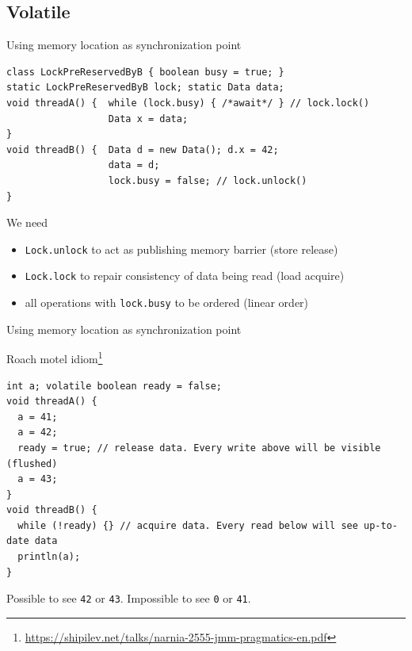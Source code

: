 \subsection{Volatile}
\showTOCSub

\begin{frame}[t,fragile]{Using memory location as synchronization point}

\begin{verbatim}
class LockPreReservedByB { boolean busy = true; }
static LockPreReservedByB lock; static Data data;
void threadA() {  while (lock.busy) { /*await*/ } // lock.lock()
                  Data x = data;  
}
void threadB() {  Data d = new Data(); d.x = 42;
                  data = d;
                  lock.busy = false; // lock.unlock()
}
\end{verbatim}

\pause

We need 
\begin{itemize}
  \item \texttt{Lock.unlock} to act as publishing memory barrier (store release)
  \item \texttt{Lock.lock} to repair consistency of data being read (load acquire)
  \item all operations with \texttt{lock.busy} to be ordered (linear order)
\end{itemize}
\end{frame}


\begin{frame}[t,fragile]{Using memory location as synchronization point}

Roach motel idiom\footnote{\tiny\url{https://shipilev.net/talks/narnia-2555-jmm-pragmatics-en.pdf}}

\begin{verbatim}
int a; volatile boolean ready = false;
void threadA() {
  a = 41;
  a = 42;
  ready = true; // release data. Every write above will be visible (flushed)
  a = 43;
}
void threadB() {
  while (!ready) {} // acquire data. Every read below will see up-to-date data
  println(a);
}
\end{verbatim}

\pause

Possible to see \texttt{42} or \texttt{43}. Impossible to see \texttt{0} or \texttt{41}.

\end{frame}

